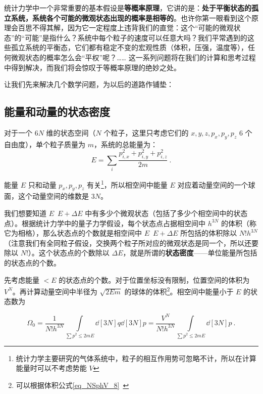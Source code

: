 
\begin{issues}
\issueDraft
\end{issues}


统计力学中一个非常重要的基本假设是\textbf{等概率原理}，它讲的是：\textbf{处于平衡状态的孤立系统，系统各个可能的微观状态出现的概率是相等的}。也许你第一眼看到这个原理会百思不得其解，因为它一定程度上违背我们的直觉：这个“可能的微观状态”的“可能”是指什么？系统中每个粒子的速度可以任意大吗？我们平常遇到的这些孤立系统的平衡态，它们都有稳定不变的宏观性质（体积，压强，温度等），任何微观状态的概率怎么会“平权”呢？…… 这一系列问题将在我们的计算和思考过程中得到解决，而我们将会惊叹于等概率原理的绝妙之处。

让我们先来解决几个数学问题，为以后的道路作铺垫：
\subsection{能量和动量的状态密度}
对于一个 $6N$ 维的状态空间（$N$ 个粒子，这里只考虑它们的 $x,y,z,p_x,p_y,p_z$ $6$ 个自由度），单个粒子质量为 $m$，系统的总能量为：
\begin{equation}
E=\sum_{i} \frac{p_{i,x}^2+p_{i,y}^2+p_{i,z}^2}{2m}~.
\end{equation}


能量 $E$ 只和动量 $p_x,p_y,p_z$ 有关\footnote{统计力学主要研究的气体系统中，粒子的相互作用势可忽略不计，所以在计算能量时可以不考虑势能 $V$}，所以相空间中能量 $E$ 对应着动量空间的一个球面，这个动量空间的维数是 $3N$。

我们想要知道 $E$~$E+\Delta E$ 中有多少个微观状态（包括了多少个相空间中的状态点）。根据统计力学中的量子力学假设，每个状态点占据相空间中 $h^{3N}$ 的体积（称它为相格），那么状态点的个数就是相空间中 $E$~$E+\Delta E$ 所包括的体积除以 $N!h^{3N}$（注意我们有全同粒子假设，交换两个粒子所对应的微观状态是同一个，所以还要除以 $N!$）。这个状态点的个数除以 $\Delta E$，就是所谓的\textbf{状态密度}——单位能量所包括的状态点的个数。

先考虑能量 $<E$ 的状态点的个数。对于位置坐标没有限制，位置空间的体积为 $V^N$。再计算动量空间中半径为 $\sqrt{2Em}$ 的球体的体积\footnote{可以根据体积公式\autoref{eq_NSphV_8}~}。相空间中能量小于 $E$ 的状态数为

\begin{equation}\label{eq_IdSDp_1}
\Omega_0 = \frac{1}{N! h^{3N}} \int\limits_{\sum p^2 \leqslant 2mE} \dd[3N]{q} \dd[3N]{p} = \frac{V^N}{N! h^{3N}} \int\limits_{\sum p^2 \leqslant 2mE} \dd[3N]{p}~.
\end{equation}


